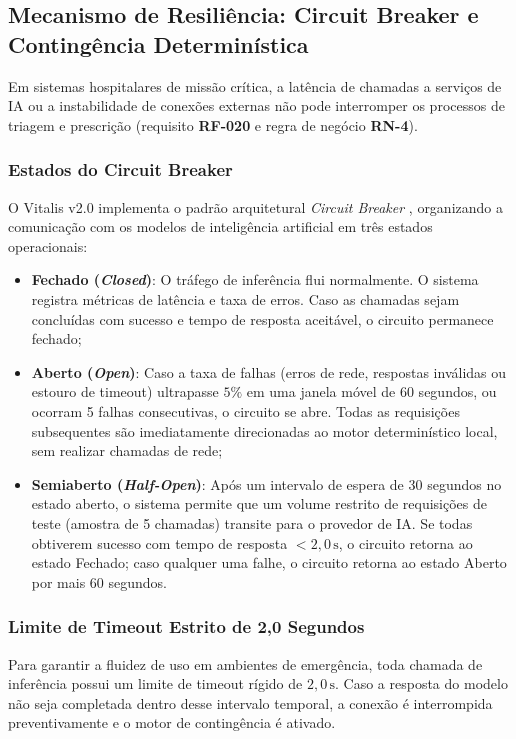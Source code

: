 \subsection{Mecanismo de Resiliência: Circuit Breaker e Contingência Determinística}
\label{subsec:ia_circuit_breaker}

Em sistemas hospitalares de missão crítica, a latência de chamadas a serviços de IA ou a instabilidade de conexões externas não pode interromper os processos de triagem e prescrição (requisito \textbf{RF-020} e regra de negócio \textbf{RN-4}).

\subsubsection{Estados do Circuit Breaker}
O Vitalis v2.0 implementa o padrão arquitetural \textit{Circuit Breaker} \cite{nygard:2018}, organizando a comunicação com os modelos de inteligência artificial em três estados operacionais:

\begin{itemize}
    \item \textbf{Fechado (\textit{Closed})}: O tráfego de inferência flui normalmente. O sistema registra métricas de latência e taxa de erros. Caso as chamadas sejam concluídas com sucesso e tempo de resposta aceitável, o circuito permanece fechado;
    \item \textbf{Aberto (\textit{Open})}: Caso a taxa de falhas (erros de rede, respostas inválidas ou estouro de timeout) ultrapasse $5\%$ em uma janela móvel de 60 segundos, ou ocorram 5 falhas consecutivas, o circuito se abre. Todas as requisições subsequentes são imediatamente direcionadas ao motor determinístico local, sem realizar chamadas de rede;
    \item \textbf{Semiaberto (\textit{Half-Open})}: Após um intervalo de espera de 30 segundos no estado aberto, o sistema permite que um volume restrito de requisições de teste (amostra de 5 chamadas) transite para o provedor de IA. Se todas obtiverem sucesso com tempo de resposta $< 2{,}0\,\text{s}$, o circuito retorna ao estado Fechado; caso qualquer uma falhe, o circuito retorna ao estado Aberto por mais 60 segundos.
\end{itemize}

\subsubsection{Limite de Timeout Estrito de 2,0 Segundos}
Para garantir a fluidez de uso em ambientes de emergência, toda chamada de inferência possui um limite de timeout rígido de $2{,}0\,\text{s}$. Caso a resposta do modelo não seja completada dentro desse intervalo temporal, a conexão é interrompida preventivamente e o motor de contingência é ativado.

